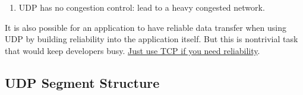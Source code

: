 
\begin{enumerate}
	\item UDP has no congestion control: lead to a heavy congested network.
\end{enumerate}

It is also possible for an application to have reliable data transfer when using UDP by building reliability into the application itself. But this is nontrivial task that would keep developers busy.  \underline{Just use TCP if you need reliability}.



\subsection{UDP Segment Structure}

